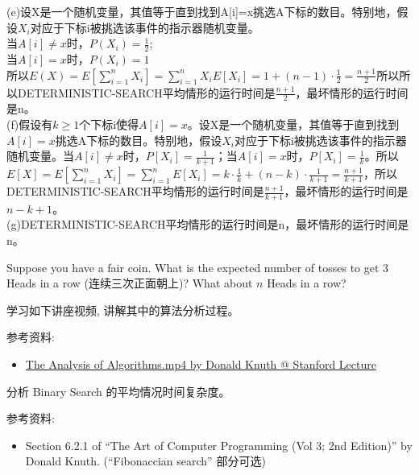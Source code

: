 \documentclass[a4paper, justified]{tufte-handout}
\begin{document}
\begin{solution}
  (e)设X是一个随机变量，其值等于直到找到A[i]=x挑选A下标的数目。特别地，假设$X_{i}$对应于下标i被挑选该事件的指示器随机变量。\\
  当$A[i]\neq x$时，$P(X_i) = \frac{1}{2}$;\\
  当$A[i] = x$时，$P(X_i) = 1$\\
  所以$E(X) = E[\sum^n_{i=1}X_i]=\sum^n_{i=1}X_iE[X_i]=1+(n-1)\cdot \frac{1}{2} = \frac{n+1}{2}$所以所以DETERMINISTIC-SEARCH平均情形的运行时间是$\frac{n+1}{2}$，最坏情形的运行时间是n。\\
  (f)假设有$k\geqslant 1$个下标i使得$A[i]=x$。设X是一个随机变量，其值等于直到找到$A[i]=x$挑选A下标的数目。特别地，假设$X_{i}$对应于下标i被挑选该事件的指示器随机变量。当$A[i]≠x$时，$P[X_{i}]=\frac{1}{k+1}$；当$A[i]=x$时，$P[X_{i}]=\frac{1}{k}$。所以$E[X]=E[\sum _{i=1}^{n}{X_{i}}]=\sum _{i=1}^{n}{E[X_{i}]}=k\cdot \frac{1}{k}+(n-k)\cdot \frac{1}{k+1}=\frac{n+1}{k+1}$，所以DETERMINISTIC-SEARCH平均情形的运行时间是$\frac{n+1}{k+1}$，最坏情形的运行时间是$n-k+1$。\\
  (g)DETERMINISTIC-SEARCH平均情形的运行时间是n，最坏情形的运行时间是n。
\end{solution}

\beginoptional

\begin{problem}
Suppose you have a fair coin.
What is the expected number of tosses to get 3 Heads in a row (连续三次正面朝上)?
What about $n$ Heads in a row?
\end{problem}

\begin{solution}
\end{solution}

\beginot

\begin{ot}
  学习如下讲座视频, 讲解其中的算法分析过程。

  \noindent 参考资料:
  \begin{itemize}
    \item \href{https://box.nju.edu.cn/f/7fda9901c7784314b3a6/}{The Analysis of Algorithms.mp4 by Donald Knuth @ Stanford Lecture}
  \end{itemize}
\end{ot}

\begin{ot}
  分析 Binary Search 的平均情况时间复杂度。

  \noindent 参考资料:
  \begin{itemize}
    \item Section 6.2.1 of ``The Art of Computer Programming (Vol 3; 2nd Edition)'' by Donald Knuth.
          (``Fibonaccian search'' 部分可选)
  \end{itemize}
\end{ot}
\end{document}
